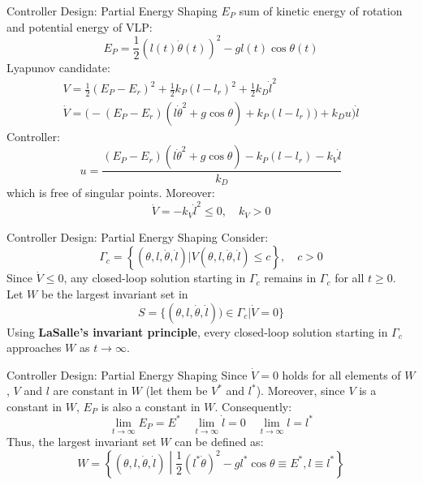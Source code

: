 \documentclass[10pt]{beamer}
\begin{document}
  \begin{frame}{Controller Design: Partial Energy Shaping}
    $E_P$ sum of kinetic energy of rotation and potential energy of VLP:
		\begin{equation*}
			E_P = \frac{1}{2}(l(t)\dot{\theta}(t))^2-gl(t)\cos\theta(t)
		\end{equation*}
		Lyapunov candidate:
		\begin{gather*}
			V = \frac{1}{2}(E_P-E_r)^2+\frac{1}{2}k_P(l-l_r)^2+
      	\frac{1}{2}k_D\dot{l}^2 \\ 
      \dot{V} = \big(-(E_P-E_r)(l\dot{\theta}^2+g\cos\theta)+k_P(l-l_r)\big)
				+ k_D u) \dot{l}
		\end{gather*}
		Controller:
		\begin{equation*}
			u = \frac{(E_P-E_r)(l\dot{\theta}^2+g\cos\theta)-k_P(l-l_r)
        -k_V\dot{l}}{k_D}
		\end{equation*}
		which is free of singular points. Moreover:
		\begin{equation*}
			\dot{V} = -k_V \dot{l}^2 \le 0, \quad k_V > 0
		\end{equation*}
  \end{frame}

	\begin{frame}{Controller Design: Partial Energy Shaping}
		Consider:
		\begin{equation*}
			\Gamma_c = \left\{(\theta,l,\dot{\theta},\dot{l})|
        V(\theta,l,\dot{\theta},\dot{l}) \le c\right\}, \quad c > 0
		\end{equation*}
    Since $\dot{V} \le 0$, any closed-loop solution starting in $\Gamma_c$
		remains in $\Gamma_c$ for all $t \ge 0$.
		Let $W$ be the largest invariant set in
    \begin{equation*}
      S = \{(\theta,l,\dot{\theta},\dot{l})) \in \Gamma_c|\dot{V}=0\}
    \end{equation*}
		Using \textbf{LaSalle's invariant principle}, every closed-loop
    solution starting in $\Gamma_c$ approaches $W$ as $t \to \infty$.
  \end{frame}

	\begin{frame}{Controller Design: Partial Energy Shaping}
		Since $\dot{V} = 0$ holds for all elements of $W$, $V$ and $l$
    are constant in $W$ (let them be $V^*$ and $l^*$). Moreover,
    since $V$ is a constant in $W$, $E_P$ is also a constant in $W$.
    Consequently:
    \begin{equation*}
      \lim_{t\rightarrow \infty} E_P = E^* \quad
			\lim_{t\rightarrow \infty} \dot{l} = 0 \quad
			\lim_{t\rightarrow \infty} l = l^*
    \end{equation*}     
    Thus, the largest invariant set $W$ can be defined as:
    \begin{equation*}
    	W = \left\{(\theta,l,\dot{\theta},\dot{l})\middle|
				\frac{1}{2}(l^*\dot{\theta})^2-gl^*\cos\theta \equiv E^*,
				l \equiv l^*\right\}
    \end{equation*}
	\end{frame}
\end{document}
